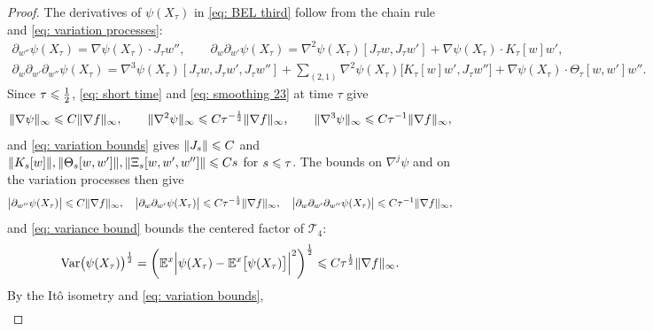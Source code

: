 \begin{proof}
    The derivatives of $\psi(X_\tau)$ in \eqref{eq: BEL third} follow from the chain rule and \eqref{eq: variation processes}:
    \begin{equation*}
    \begin{gathered}
        \partial_{w''} \psi(X_\tau) = \nabla \psi(X_\tau) \cdot J_\tau w'' , \qquad
        \partial_w \partial_{w'} \psi(X_\tau) = \nabla^2 \psi(X_\tau)[J_\tau w, J_\tau w'] + \nabla \psi(X_\tau) \cdot K_\tau[w] w' , \\
        \partial_w \partial_{w'} \partial_{w''} \psi(X_\tau) = \nabla^3 \psi(X_\tau)[J_\tau w, J_\tau w', J_\tau w''] + \sum_{(2,1)} \nabla^2 \psi(X_\tau)\bigl[ K_\tau[w] w', J_\tau w'' \bigr] + \nabla \psi(X_\tau) \cdot \Theta_\tau[w,w'] w'' .
    \end{gathered}
    \end{equation*}
    Since $\tau \leqslant \frac12$, \eqref{eq: short time} and \eqref{eq: smoothing 23} at time $\tau$ give
    \begin{equation*}
        \lVert \nabla\psi \rVert_\infty \leqslant C\lVert \nabla f \rVert_\infty , \qquad
        \lVert \nabla^2\psi \rVert_\infty \leqslant C\tau^{-\frac12}\lVert \nabla f \rVert_\infty , \qquad
        \lVert \nabla^3 \psi \rVert_\infty \leqslant C \tau^{-1}\lVert \nabla f \rVert_\infty ,
    \end{equation*}
    and \eqref{eq: variation bounds} gives $\lVert J_s \rVert \leqslant C$ and $\lVert K_s[w] \rVert, \lVert \Theta_s[w,w'] \rVert, \lVert \Xi_s[w,w',w''] \rVert \leqslant C s$ for $s \leqslant \tau$. The bounds on $\nabla^j \psi$ and on the variation processes then give
    \begin{equation}
        \bigl| \partial_{w''} \psi(X_\tau) \bigr| \leqslant C\lVert \nabla f \rVert_\infty , \quad
        \bigl| \partial_w \partial_{w'} \psi(X_\tau) \bigr| \leqslant C\tau^{-\frac12}\lVert \nabla f \rVert_\infty , \quad
        \bigl| \partial_w \partial_{w'} \partial_{w''} \psi(X_\tau) \bigr| \leqslant C\tau^{-1}\lVert \nabla f \rVert_\infty ,
        \label{eq: psi derivative bounds}
    \end{equation}
    and \eqref{eq: variance bound} bounds the centered factor of $\mathcal T_4$:
    \begin{equation}
        \mathrm{Var}\bigl( \psi(X_\tau) \bigr)^{\frac12} = \biggl( \mathbb E^x \Bigl| \psi(X_\tau) - \mathbb E^x \bigl[ \psi(X_\tau) \bigr] \Bigr|^2 \biggr)^{\frac12} \leqslant C \tau^{\frac12} \lVert \nabla f \rVert_\infty .
        \label{eq: centered factor}
    \end{equation}
    By the It\^o isometry and \eqref{eq: variation bounds},
    \begin{equation}
    \begin{gathered}

\end{gathered}
\end{equation}
\end{proof}
